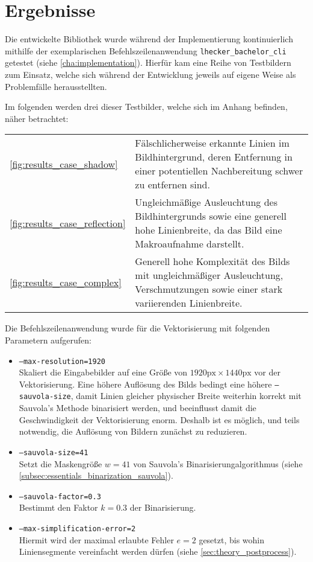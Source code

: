 \chapter{Ergebnisse}%
\label{cha:results}

Die entwickelte Bibliothek wurde während der Implementierung kontinuierlich mithilfe der exemplarischen Befehlszeilenanwendung \texttt{lhecker\_bachelor\_cli} getestet (siehe \autoref{cha:implementation}).
Hierfür kam eine Reihe von Testbildern zum Einsatz, welche sich während der Entwicklung jeweils auf eigene Weise als Problemfälle herausstellten.

Im folgenden werden drei dieser Testbilder, welche sich im Anhang befinden, näher betrachtet:

\begin{tabu}{lX}
    \autoref{fig:results_case_shadow} & Fälschlicherweise erkannte Linien im Bildhintergrund, deren Entfernung in einer potentiellen Nachbereitung schwer zu entfernen sind. \\
    \autoref{fig:results_case_reflection} & Ungleichmäßige Ausleuchtung des Bildhintergrunds sowie eine generell hohe Linienbreite, da das Bild eine Makroaufnahme darstellt. \\
    \autoref{fig:results_case_complex} & Generell hohe Komplexität des Bilds mit ungleichmäßiger Ausleuchtung, Verschmutzungen sowie einer stark variierenden Linienbreite.
\end{tabu}

\mbox{}

Die Befehlszeilenanwendung wurde für die Vektorisierung mit folgenden Parametern aufgerufen:

\begin{itemize}
    \item \texttt{--max-resolution=1920} \\
    Skaliert die Eingabebilder auf eine Größe von \(1920\text{px}\times1440\text{px}\) vor der Vektorisierung.
    Eine höhere Auflösung des Bilds bedingt eine höhere \texttt{--sauvola-size}, damit Linien gleicher physischer Breite weiterhin korrekt mit Sauvola's Methode binarisiert werden, und beeinflusst damit die Geschwindigkeit der Vektorisierung enorm.
    Deshalb ist es möglich, und teils notwendig, die Auflösung von Bildern zunächst zu reduzieren.
    \item \texttt{--sauvola-size=41} \\
    Setzt die Maskengröße \(w = 41\) von Sauvola's Binarisierungalgorithmus (siehe \autoref{subsec:essentials_binarization_sauvola}).
    \item \texttt{--sauvola-factor=0.3} \\
    Bestimmt den Faktor \(k = 0.3\) der Binarisierung.
    \item \texttt{--max-simplification-error=2} \\
    Hiermit wird der maximal erlaubte Fehler \(e = 2\) gesetzt, bis wohin Liniensegmente vereinfacht werden dürfen (siehe \autoref{sec:theory_postprocess}).
\end{itemize}

